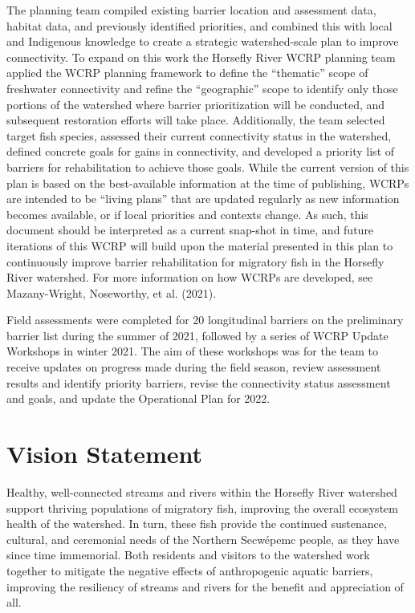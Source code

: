 \documentclass[
  letterpaper,
  DIV=11,
  numbers=noendperiod]{scrreprt}
\begin{document}
The planning team compiled existing barrier location and assessment
data, habitat data, and previously identified priorities, and combined
this with local and Indigenous knowledge to create a strategic
watershed-scale plan to improve connectivity. To expand on this work the
Horsefly River WCRP planning team applied the WCRP planning framework to
define the ``thematic'' scope of freshwater connectivity and refine the
``geographic'' scope to identify only those portions of the watershed
where barrier prioritization will be conducted, and subsequent
restoration efforts will take place. Additionally, the team selected
target fish species, assessed their current connectivity status in the
watershed, defined concrete goals for gains in connectivity, and
developed a priority list of barriers for rehabilitation to achieve
those goals. While the current version of this plan is based on the
best-available information at the time of publishing, WCRPs are intended
to be ``living plans'' that are updated regularly as new information
becomes available, or if local priorities and contexts change. As such,
this document should be interpreted as a current snap-shot in time, and
future iterations of this WCRP will build upon the material presented in
this plan to continuously improve barrier rehabilitation for migratory
fish in the Horsefly River watershed. For more information on how WCRPs
are developed, see Mazany-Wright, Noseworthy, et al. (2021).

Field assessments were completed for 20 longitudinal barriers on the
preliminary barrier list during the summer of 2021, followed by a series
of WCRP Update Workshops in winter 2021. The aim of these workshops was
for the team to receive updates on progress made during the field
season, review assessment results and identify priority barriers, revise
the connectivity status assessment and goals, and update the Operational
Plan for 2022.

\section*{Vision Statement}\label{vision-statement}


Healthy, well-connected streams and rivers within the Horsefly River
watershed support thriving populations of migratory fish, improving the
overall ecosystem health of the watershed. In turn, these fish provide
the continued sustenance, cultural, and ceremonial needs of the Northern
Secwépemc people, as they have since time immemorial. Both residents and
visitors to the watershed work together to mitigate the negative effects
of anthropogenic aquatic barriers, improving the resiliency of streams
and rivers for the benefit and appreciation of all.
\end{document}

